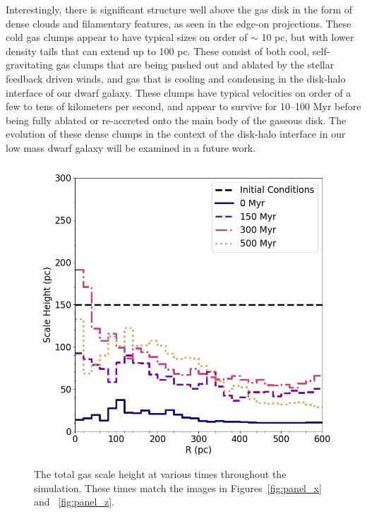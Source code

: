 \documentclass[twocolumn]{aastex61}
\begin{document}
Interestingly, there is significant structure well above the gas disk in the form of dense clouds and filamentary features, as seen in the edge-on projections. These cold gas clumps appear to have typical sizes on order of $\sim$ 10 pc, but with lower density tails that can extend up to 100 pc. These consist of both cool, self-gravitating gas clumps that are being pushed out and ablated by the stellar feedback driven winds, and gas that is cooling and condensing in the disk-halo interface of our dwarf galaxy. These clumps have typical velocities on order of a few to tens of kilometers per second, and appear to survive for 10--100 Myr before being fully ablated or re-accreted onto the main body of the gaseous disk. The evolution of these dense clumps in the context of the disk-halo interface in our low mass dwarf galaxy will be examined in a future work. 

\begin{figure}
\centering
\includegraphics[width=0.975\linewidth]{scale_height}
\caption{The total gas scale height at various times throughout the simulation. These times match the images in Figures~\ref{fig:panel_x} and ~\ref{fig:panel_z}.}
\label{fig:scale_height}
\end{figure}
\end{document}
